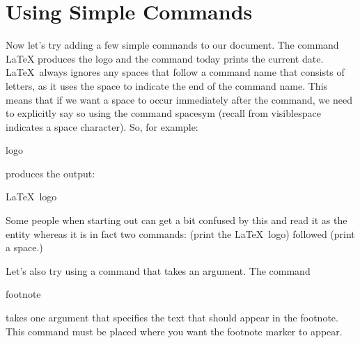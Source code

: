 
\section{Using Simple Commands}
\label{sec:simple}

Now let's try
adding a few simple \glspl{command} to our
document. The command \gls{LaTeX} produces the
 logo and the command \gls{today} prints
the current date. \LaTeX\ always ignores any spaces that follow a
command name that consists of letters, as it uses the space to
indicate the end of the command name. This means that if we want a
space to occur immediately after the command, we need to explicitly
say so using the command \gls{spacesym} (recall from
\gls{visiblespace} indicates a space character). So, for example:
\begin{codeS}
logo
\end{codeS}%
produces the output:
\begin{resultS}
\LaTeX\ logo
\end{resultS}%
Some people when starting out can get a bit confused by this and
read it as the entity  whereas it is
in fact two commands:  (print the \LaTeX\ logo)
followed \dq{\cmdname{\ }} (print a space.)

Let's also try using a command that takes an 
\gls{argument}.  The command 
\begin{definition}
\gls{footnote}\label{cmd:footnote}
\end{definition}%
takes one argument that specifies the text that should
appear in the footnote.  This command must be placed where you want
the footnote marker to appear.

